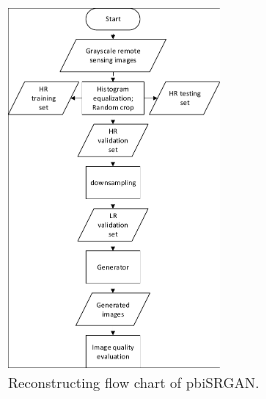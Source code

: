 \documentclass[10pt,twocolumn,letterpaper]{article}
\begin{document}
 \begin{figure}
\begin{center}
\includegraphics[width=0.5\textwidth]{fig2}
\end{center}
   \caption{Reconstructing flow chart of pbiSRGAN.}
\label{fig2}
\end{figure}



{\small


}
\end{document}
